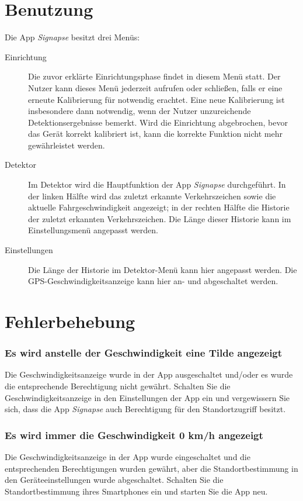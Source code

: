 \documentclass[12pt,a4paper,ngerman,enabledeprecatedfontcommands]{article}
\begin{document}
\section{Benutzung}
\label{sec:benutzung}

Die App \textit{Signapse} besitzt drei Menüs:

\begin{description}
    \item[Einrichtung] Die zuvor erklärte Einrichtungsphase findet in diesem Menü statt. Der Nutzer kann dieses Menü jederzeit aufrufen oder schließen, falls er eine erneute Kalibrierung für notwendig erachtet. Eine neue Kalibrierung ist insbesondere dann notwendig, wenn der Nutzer unzureichende Detektionsergebnisse bemerkt.  Wird die Einrichtung abgebrochen, bevor das Gerät korrekt kalibriert ist, kann die korrekte Funktion nicht mehr gewährleistet werden.
    
    \item[Detektor] Im Detektor wird die Hauptfunktion der App \textit{Signapse} durchgeführt. In der linken Hälfte wird das zuletzt erkannte Verkehrszeichen sowie die aktuelle Fahrgeschwindigkeit angezeigt; in der rechten Hälfte die Historie der zuletzt erkannten Verkehrszeichen. Die Länge dieser Historie kann im Einstellungsmenü angepasst werden.
    
    \item[Einstellungen] Die Länge der Historie im Detektor-Menü kann hier angepasst werden. Die GPS-Geschwindigkeitsanzeige kann hier an- und abgeschaltet werden.
\end{description}

\section{Fehlerbehebung}

\subsubsection*{Es wird anstelle der Geschwindigkeit eine Tilde angezeigt}
Die Geschwindigkeitsanzeige wurde in der App ausgeschaltet und/oder es wurde die entsprechende Berechtigung nicht gewährt. Schalten Sie die Geschwindigkeitsanzeige in den Einstellungen der App ein und vergewissern Sie sich, dass die App \textit{Signapse} auch Berechtigung für den Standortzugriff besitzt.

\subsubsection*{Es wird immer die Geschwindigkeit 0 km/h angezeigt}
Die Geschwindigkeitsanzeige in der App wurde eingeschaltet und die entsprechenden Berechtigungen wurden gewährt, aber die Standortbestimmung in den Geräteeinstellungen wurde abgeschaltet. Schalten Sie die Standortbestimmung ihres Smartphones ein und starten Sie die App neu.
\end{document}
